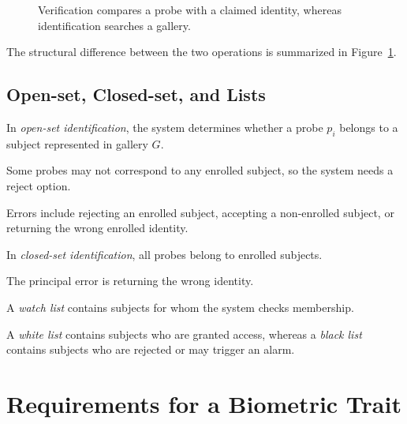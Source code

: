 \documentclass[11pt,a4paper,oneside]{report}
\begin{document}
\begin{figure}[htbp]

\fi

\caption{
Verification compares a probe with a claimed identity,
whereas identification searches a gallery.
}
\label{fig:verification-identification}

\end{figure}

The structural difference between the two operations is summarized in
Figure~\ref{fig:verification-identification}.

\subsection{Open-set, Closed-set, and Lists}

In \emph{open-set identification}, the system determines whether a probe
\(p_i\) belongs to a subject represented in gallery \(G\).

Some probes may not correspond to any enrolled subject, so the system
needs a reject option.

Errors include rejecting an enrolled subject, accepting a non-enrolled
subject, or returning the wrong enrolled identity.

In \emph{closed-set identification}, all probes belong to enrolled
subjects.

The principal error is returning the wrong identity.

A \emph{watch list} contains subjects for whom the system checks
membership.

A \emph{white list} contains subjects who are granted access, whereas a
\emph{black list} contains subjects who are rejected or may trigger an
alarm.

\section{Requirements for a Biometric Trait}
\label{subsec:trait-requirements}
\end{document}
